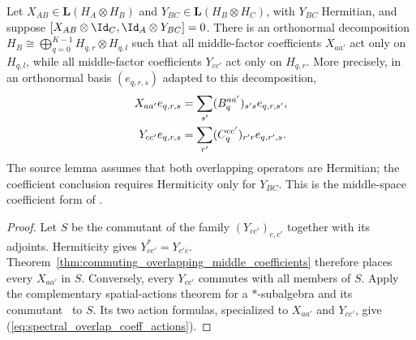 \begin{theorem}%
    \label{thm:commuting_overlapping_coefficient_spatial_decomposition}
    \leanok
    Let $X_{AB}\in\mathbf L(H_A\otimes H_B)$ and
    $Y_{BC}\in\mathbf L(H_B\otimes H_C)$, with $Y_{BC}$ Hermitian, and
    suppose $[X_{AB}\otimes\Id_C,\Id_A\otimes Y_{BC}]=0$. There is an
    orthonormal decomposition
    $H_B\cong\bigoplus_{q=0}^{K-1}H_{q,r}\otimes H_{q,l}$ such that all
    middle-factor coefficients $X_{aa'}$ act only on $H_{q,l}$, while all
    middle-factor coefficients $Y_{cc'}$ act only on $H_{q,r}$. More
    precisely, in an orthonormal basis $(e_{q,r,s})$ adapted to this
    decomposition,
    \begin{align}
        X_{aa'}e_{q,r,s}
         & =\sum_{s'}(B^{aa'}_q)_{s's}e_{q,r,s'}, \notag \\
        Y_{cc'}e_{q,r,s}
         & =\sum_{r'}(C^{cc'}_q)_{r'r}e_{q,r',s}.
        \label{eq:spectral_overlap_coeff_actions}
    \end{align}
    The source lemma assumes that both overlapping operators are Hermitian;
    the coefficient conclusion requires Hermiticity only for $Y_{BC}$.
    This is the middle-space coefficient form of
    \cite[Lemma~2.1]{Beigi2012Classification}.
\end{theorem}

\begin{proof}
    \leanok
    Let $S$ be the commutant of the family $(Y_{cc'})_{c,c'}$ together with
    its adjoints. Hermiticity gives $Y_{cc'}^*=Y_{c'c}$.
    Theorem~\ref{thm:commuting_overlapping_middle_coefficients} therefore
    places every $X_{aa'}$ in $S$. Conversely, every $Y_{cc'}$ commutes
    with all members of $S$. Apply the complementary spatial-actions
    theorem for a $*$-subalgebra and its commutant~\cite[``Complementary
    spatial actions of a $*$-subalgebra and its commutant'']{QICLean2026Blueprint}
    to $S$. Its two action formulas, specialized to $X_{aa'}$ and $Y_{cc'}$,
    give (\ref{eq:spectral_overlap_coeff_actions}).
\end{proof}

